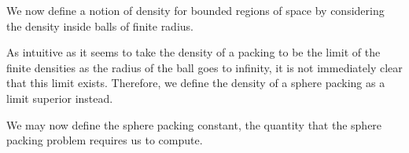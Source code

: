 We now define a notion of density for bounded regions of space by considering the density inside balls of finite radius.


As intuitive as it seems to take the density of a packing to be the limit of the finite densities as the radius of the ball goes to infinity, it is not immediately clear that this limit exists. Therefore, we define the density of a sphere packing as a limit superior instead.


We may now define the sphere packing constant, the quantity that the sphere packing problem requires us to compute.


